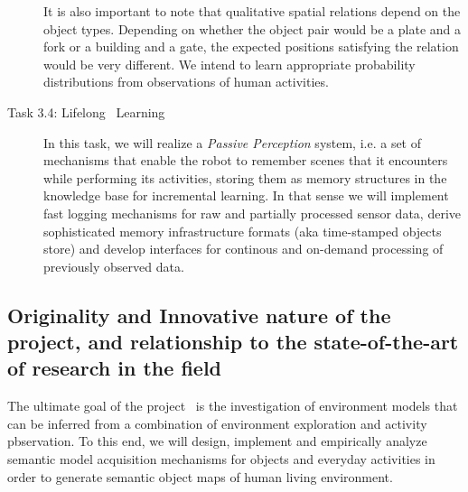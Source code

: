 \begin{description}
  It is also important to note that qualitative spatial relations
  depend on the object types. Depending on whether the
  object pair would be a plate and a fork or a building and a gate,
  the expected positions satisfying the relation would be very
  different. We intend to learn appropriate probability distributions
  from observations of human activities.

\item[Task 3.4: Lifelong \ksem\ Learning]
  In this task, we will realize a 
  \emph{Passive Perception} system, i.e. a set of mechanisms that enable the robot to 
  remember scenes that it encounters while performing its activities, storing them 
  as memory structures in the knowledge base for incremental learning. In that sense we will implement fast 
  logging mechanisms for raw and partially processed sensor data, derive
  sophisticated memory infrastructure formats (aka time-stamped objects store) 
  and develop interfaces for continous and on-demand processing of previously observed data.
\end{description}
\subsection{Originality and Innovative nature of the project, and relationship to the state-of-the-art of 
research in the field}
The ultimate goal of the project \ksem\ is the investigation of 
environment models that can be inferred from a combination of 
environment exploration and activity pbservation. To this end, we 
will design, implement and empirically analyze semantic model 
acquisition mechanisms for objects and everyday activities in order 
to generate semantic object maps of human living environment.


